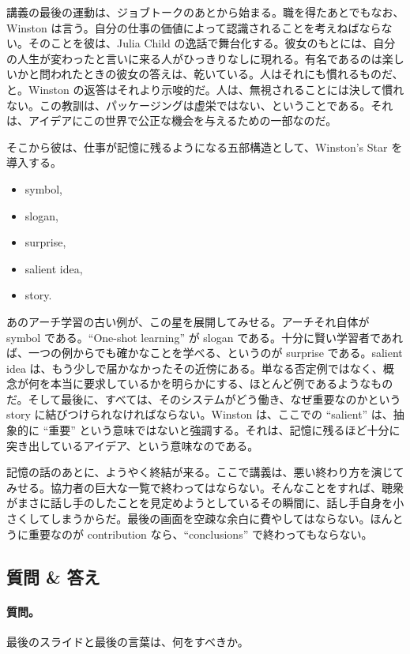講義の最後の運動は、ジョブトークのあとから始まる。職を得たあとでもなお、Winston は言う。自分の仕事の価値によって認識されることを考えねばならない。そのことを彼は、Julia Child の逸話で舞台化する。彼女のもとには、自分の人生が変わったと言いに来る人がひっきりなしに現れる。有名であるのは楽しいかと問われたときの彼女の答えは、乾いている。人はそれにも慣れるものだ、と。Winston の返答はそれより示唆的だ。人は、無視されることには決して慣れない。この教訓は、パッケージングは虚栄ではない、ということである。それは、アイデアにこの世界で公正な機会を与えるための一部なのだ。

そこから彼は、仕事が記憶に残るようになる五部構造として、Winston's Star を導入する。

\begin{itemize}
\item symbol,
\item slogan,
\item surprise,
\item salient idea,
\item story.
\end{itemize}

あのアーチ学習の古い例が、この星を展開してみせる。アーチそれ自体が symbol である。``One-shot learning'' が slogan である。十分に賢い学習者であれば、一つの例からでも確かなことを学べる、というのが surprise である。salient idea は、もう少しで届かなかったその近傍にある。単なる否定例ではなく、概念が何を本当に要求しているかを明らかにする、ほとんど例であるようなものだ。そして最後に、すべては、そのシステムがどう働き、なぜ重要なのかという story に結びつけられなければならない。Winston は、ここでの ``salient'' は、抽象的に ``重要'' という意味ではないと強調する。それは、記憶に残るほど十分に突き出しているアイデア、という意味なのである。

記憶の話のあとに、ようやく終結が来る。ここで講義は、悪い終わり方を演じてみせる。協力者の巨大な一覧で終わってはならない。そんなことをすれば、聴衆がまさに話し手のしたことを見定めようとしているその瞬間に、話し手自身を小さくしてしまうからだ。最後の画面を空疎な余白に費やしてはならない。ほんとうに重要なのが contribution なら、``conclusions'' で終わってもならない。

\subsection{質問 \& 答え}

\paragraph{質問。} 最後のスライドと最後の言葉は、何をすべきか。

